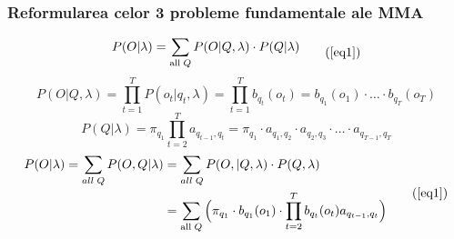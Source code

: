 \begin{frame}
  \frametitle{Reformularea celor 3 probleme fundamentale ale MMA}
  \begin{equation}
    \begin{split}
      P(O \vert \lambda) = \displaystyle\sum_{\text{all}\;Q} P(O \vert
      Q, \lambda) \cdot P(Q \vert \lambda)
    \end{split}
    \tag{\ref{eq1}}
  \end{equation}
  \pause \vspace*{.em}
  \begin{equation}
    P(O \vert Q, \lambda) = \displaystyle\prod_{t=1}^{T} P(o_t \vert
    q_t, \lambda)= \displaystyle\prod_{t=1}^{T} b_{q_t}(o_t) =
    b_{q_1}(o_1) \cdot \ldots \cdot b_{q_T}(o_T)
    \label{eq:pql}
  \end{equation}\pause
  \vspace*{.em}
  \begin{equation}
    P(Q | \lambda) = \pi_{q_1}\displaystyle\prod_{t=2}^{T}
    a_{q_{t-1},q_t} = \pi_{q_1} \cdot a_{q_1,q_2} \cdot a_{q_2,q_3} \cdot \ldots \cdot
    a_{q_{T-1},q_T}\label{eq:pql2}
  \end{equation}\pause
  \vspace*{.em}
  \begin{equation}
    \begin{split}
      P(O \vert \lambda) = \displaystyle\sum_{all\;Q} P(O, Q \vert
      \lambda) & = \displaystyle\sum_{all\;Q} P(O,\vert Q, \lambda)
      \cdot P(Q, \lambda) \\
      & = \displaystyle\sum_{\text{all}\;Q} \Big( \pi_{q_1} \cdot
      b_{q_1}(o_1) \cdot \displaystyle\prod_{t=2}^{T} b_{q_t}(o_t)
      a_{q_{t-1},q_t} \Big)
    \end{split}
    \tag{\ref{eq1}}
  \end{equation}
\end{frame}

